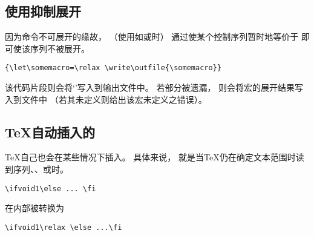 \documentclass{book}
\begin{document}
\subsection{使用抑制展开}

因为命令不可展开的缘故，
（使用如或时）
通过使某个控制序列暂时地等价于
即可使该序列不被展开。
\begin{verbatim}
{\let\somemacro=\relax \write\outfile{\somemacro}}
\end{verbatim}
该代码片段则会将`'写入到输出文件中。
若部分被遗漏，
则会将宏的展开结果写入到文件中
（若其未定义则给出该宏未定义之错误）。

\subsection{{\TeX}自动插入的}
\label{bump:relax}

{\TeX}自己也会在某些情况下插入。
具体来说，
就是当{\TeX}仍在确定文本范围时读到序列、、或时。
\begin{example}
\begin{verbatim}
\ifvoid1\else ... \fi
\end{verbatim}
在内部被转换为
\begin{verbatim}
\ifvoid1\relax \else ...\fi
\end{verbatim}
\end{example}
\end{document}
